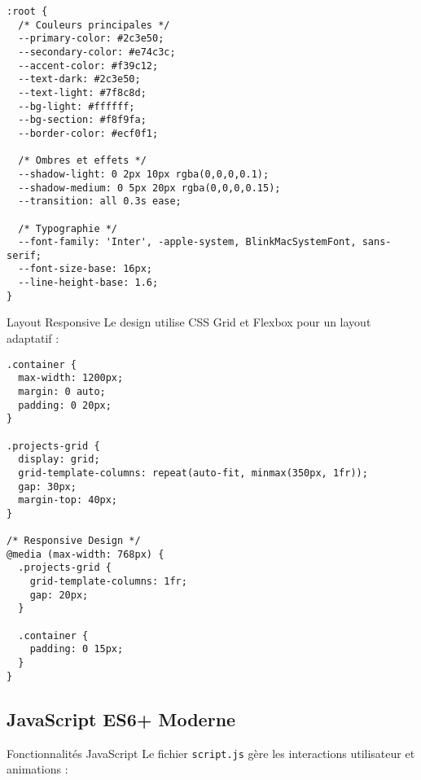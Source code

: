 \documentclass[12pt,a4paper]{article}
\begin{document}
\begin{lstlisting}[style=cssstyle, caption=Variables CSS principales]
:root {
  /* Couleurs principales */
  --primary-color: #2c3e50;
  --secondary-color: #e74c3c;
  --accent-color: #f39c12;
  --text-dark: #2c3e50;
  --text-light: #7f8c8d;
  --bg-light: #ffffff;
  --bg-section: #f8f9fa;
  --border-color: #ecf0f1;
  
  /* Ombres et effets */
  --shadow-light: 0 2px 10px rgba(0,0,0,0.1);
  --shadow-medium: 0 5px 20px rgba(0,0,0,0.15);
  --transition: all 0.3s ease;
  
  /* Typographie */
  --font-family: 'Inter', -apple-system, BlinkMacSystemFont, sans-serif;
  --font-size-base: 16px;
  --line-height-base: 1.6;
}
\end{lstlisting}

\begin{greenbox}{Layout Responsive}
Le design utilise CSS Grid et Flexbox pour un layout adaptatif :
\end{greenbox}

\begin{lstlisting}[style=cssstyle, caption=Grid Layout et Responsive]
.container {
  max-width: 1200px;
  margin: 0 auto;
  padding: 0 20px;
}

.projects-grid {
  display: grid;
  grid-template-columns: repeat(auto-fit, minmax(350px, 1fr));
  gap: 30px;
  margin-top: 40px;
}

/* Responsive Design */
@media (max-width: 768px) {
  .projects-grid {
    grid-template-columns: 1fr;
    gap: 20px;
  }
  
  .container {
    padding: 0 15px;
  }
}
\end{lstlisting}

\subsection{JavaScript ES6+ Moderne}

\begin{redbox}{Fonctionnalités JavaScript}
Le fichier \texttt{script.js} gère les interactions utilisateur et animations :
\end{redbox}
\end{document}

